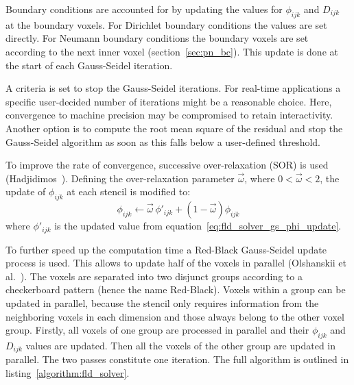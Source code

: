 Boundary conditions are accounted for by updating the values for $\phi_{ijk}$ and $D_{ijk}$ at the boundary voxels. For Dirichlet boundary conditions the values are set directly. For Neumann boundary conditions the boundary voxels are set according to the next inner voxel (section~\ref{sec:pn_bc}). This update is done at the start of each Gauss-Seidel iteration.

A criteria is set to stop the Gauss-Seidel iterations. For real-time applications a specific user-decided number of iterations might be a reasonable choice. Here, convergence to machine precision may be compromised to retain interactivity. Another option is to compute the root mean square of the residual and stop the Gauss-Seidel algorithm as soon as this falls below a user-defined threshold.

To improve the rate of convergence, successive over-relaxation (SOR) is used (Hadjidimos~\cite{Hadjidimos00}). Defining the over-relaxation parameter $\vec{\omega}$, where $0<\vec{\omega}<2$, the update of $\phi_{ijk}$ at each stencil is modified to:
\begin{equation}
\label{eq:fld_solver_sor_update}
\phi_{ijk} \leftarrow \vec{\omega} \,\phi'_{ijk} + (1-\vec{\omega})\phi_{ijk} 
\end{equation}
where $\phi'_{ijk}$ is the updated value from equation~\ref{eq:fld_solver_gs_phi_update}.

To further speed up the computation time a Red-Black Gauss-Seidel update process is used. This allows to update half of the voxels in parallel (Olshanskii et al.~\cite{Olshanskii14}). The voxels are separated into two disjunct groups according to a checkerboard pattern (hence the name Red-Black). Voxels within a group can be updated in parallel, because the stencil only requires information from the neighboring voxels in each dimension and those always belong to the other voxel group. Firstly, all voxels of one group are processed in parallel and their $\phi_{ijk}$ and $D_{ijk}$ values are updated. Then all the voxels of the other group are updated in parallel. The two passes constitute one iteration. The full algorithm is outlined in listing~\ref{algorithm:fld_solver}.



